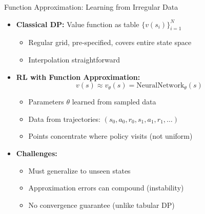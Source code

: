 \begin{frame}{Function Approximation: Learning from Irregular Data}
\begin{itemize}
\item \textbf{Classical DP:} Value function as table $\{v(s_i)\}_{i=1}^{N}$
\begin{itemize}
    \item Regular grid, pre-specified, covers entire state space
    \item Interpolation straightforward
\end{itemize}

\medskip
\item \textbf{RL with Function Approximation:}
\[
v(s) \approx v_\theta(s) = \text{NeuralNetwork}_\theta(s)
\]
\begin{itemize}
    \item Parameters $\theta$ learned from sampled data
    \item Data from trajectories: $(s_0, a_0, r_0, s_1, a_1, r_1, \ldots)$
    \item Points concentrate where policy visits (not uniform)
\end{itemize}

\medskip
\item \textbf{Challenges:}
\begin{itemize}
    \item Must generalize to unseen states
    \item Approximation errors can compound (instability)
    \item No convergence guarantee (unlike tabular DP)
\end{itemize}
\end{itemize}
\end{frame}

